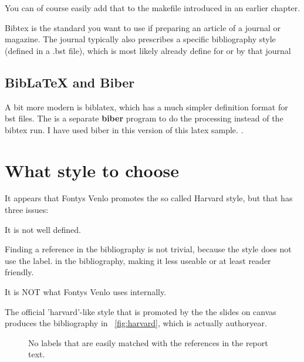 You can of course easily add that to the makefile introduced in an
earlier chapter.

Bibtex is the standard you want to use if preparing an article of a
journal or magazine. The journal typically also prescribes a specific
bibliography style (defined in a .bst file), which is most likely
already define for or by that journal

\subsection{BibLaTeX and Biber}

A bit more modern is biblatex, which has a much simpler definition
format for bst files. The is a separate \textbf{biber} program to do
the processing instead of the bibtex run.
I have used biber in this version of this latex sample. \parencite{biblatexsite}.

\section{What style to choose}

It appears that Fontys Venlo promotes the so called Harvard style, but that has three issues:
\begin{Enumerate}
\item It is not well defined.
\item Finding a reference in the bibliography is not trivial, because the style does not use the label.
  in the bibliography, making it less useable or at least reader friendly.
\item It is NOT what Fontys Venlo uses internally.
\end{Enumerate}


The official 'harvard'-like style that is promoted by the the slides on canvas
produces the bibliography in ~\vref{fig:harvard}, which is actually authoryear.

\begin{figure}
  \caption{\label{fig:harvard}No labels that are easily matched with the references in the report text.}
\end{figure}

